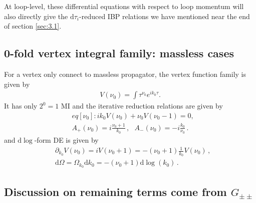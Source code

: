 \documentclass[a4paper,11pt]{article}
\newcommand{\nn}{\nonumber}
\newcommand{\nd}{\mathrm{d}}
\begin{document}
At loop-level, these differential equations with respect to loop momentum will also directly give the $\nd\tau_i$-reduced IBP relations we have mentioned near the end of section \ref{sec:3.1}.



\subsection{0-fold vertex integral family: massless cases}  \label{sec:3.6}
For a vertex only connect to massless propagator, the vertex function family is given by
\begin{align}
V(\nu_0)=\int \tau^{\nu_0} e^{i k_0 \tau}.
\end{align}
It has only $2^0=1$ MI and the iterative reduction relations are given by
\begin{align}
&eq[\nu_0]: i k_0 V(\nu_0) + \nu_0 V(\nu_0-1) = 0, \nn\\
&A_+(\nu_0) = i\frac{\nu_0+1}{k_0}\,,~~~A_-(\nu_0) = -i\frac{k_0}{\nu_0}\,. 
\end{align}
and $\nd \log$-form DE is given by
\begin{align}
&\partial_{k_0} V(\nu_0) = i V(\nu_0+1) = -(\nu_0+1) \frac{1}{k_0} V(\nu_0)  \, , \nn\\
&\nd \Omega = \Omega_{k_0} \nd k_0 = -(\nu_0+1) \nd\log(k_0) \, .
\end{align}


\subsection{Discussion on remaining terms come from $G_{\pm\pm}$} \label{sec:3.7}
\end{document}
